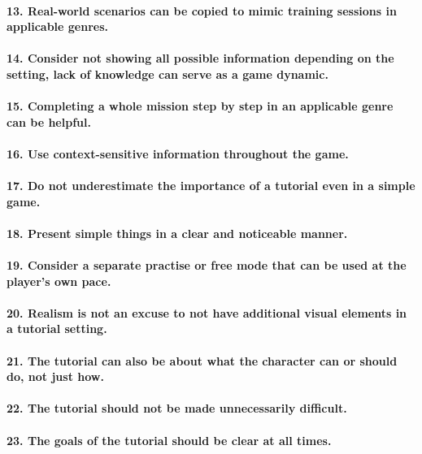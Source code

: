 \paragraph{13. Real-world scenarios can be copied to mimic training sessions in applicable genres.}
\paragraph{14. Consider not showing all possible information depending on the setting, lack of knowledge can serve as a game dynamic.}
\paragraph{15. Completing a whole mission step by step in an applicable genre can be helpful.}
\paragraph{16. Use context-sensitive information throughout the game. }
\paragraph{17. Do not underestimate the importance of a tutorial even in a simple game.}
\paragraph{18. Present simple things in a clear and noticeable manner.}
\paragraph{19. Consider a separate practise or free mode that can be used at the player's own pace.}
\paragraph{20. Realism is not an excuse to not have additional visual elements in a tutorial setting.}
\paragraph{21. The tutorial can also be about what the character can or should do, not just how.}
\paragraph{22. The tutorial should not be made unnecessarily difficult.}
\paragraph{23. The goals of the tutorial should be clear at all times.}
